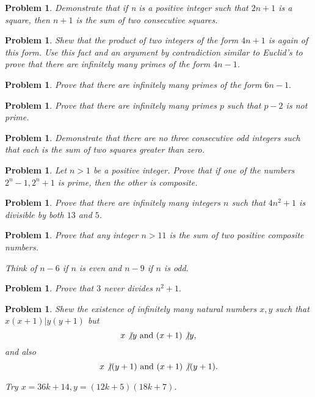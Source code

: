 \documentclass[11pt, openany]{book}
\theoremstyle{change} \theoremheaderfont{\blue\sffamily\bfseries}
\newtheorem{pro}[thm]{Problem}
\theoremstyle{nonumberplain} \theoremheaderfont{\sffamily\bfseries}
\newcommand{\í}{\'{\i}}
\begin{document}
\begin{multicols}{2}
\begin{pro}
Demonstrate that if n is a positive integer such that $2n + 1$ is
a square, then $n + 1$ is the sum of two consecutive squares.
\end{pro}
\begin{pro}
Shew that the product of two integers of the form $4n + 1$ is
again of this form. Use this fact and an argument by contradiction
similar to Euclid's to prove that there are infinitely many primes
of the form $4n - 1$.\end{pro}
\begin{pro}
Prove that there are infinitely many primes of the form $6n - 1.$
\end{pro}
\begin{pro}
Prove that there are infinitely many primes $p$ such that $p - 2$
is not prime.
\end{pro}
\begin{pro}Demonstrate that there are no three consecutive odd integers such that
each is the sum of two squares greater than zero.\end{pro}
\begin{pro} Let $n > 1$ be a positive integer. Prove that if one of the
numbers $2^n - 1, 2^n + 1$ is prime, then the other is composite.
\end{pro}
\begin{pro} Prove that there are infinitely many integers $n$ such that
$4n^2 + 1$ is divisible by both $13$ and $5$.\end{pro}
\begin{pro} Prove that any integer $n > 11$ is the sum of two
positive composite numbers.
\begin{answer}
Think of $n - 6$ if $n$ is even and $n - 9$ if $n$ is odd.
\end{answer}

\end{pro}
\begin{pro}
Prove that $3$ never divides $n^2 + 1.$\end{pro}

\begin{pro}  Shew the existence of infinitely many natural numbers
$x, y$ such that $x(x + 1)|y(y + 1)$ but
$$ x\not |y \,\, {\rm and}\,\, (x + 1)\not |y, $$and also
$$ x\not |(y + 1)\,\, {\rm and}\,\, (x + 1) \not |(y + 1).$$
\begin{answer}
Try $x = 36k + 14, y = (12k + 5)(18k + 7)$.
\end{answer}

\end{pro}
\end{multicols}
\end{document}
